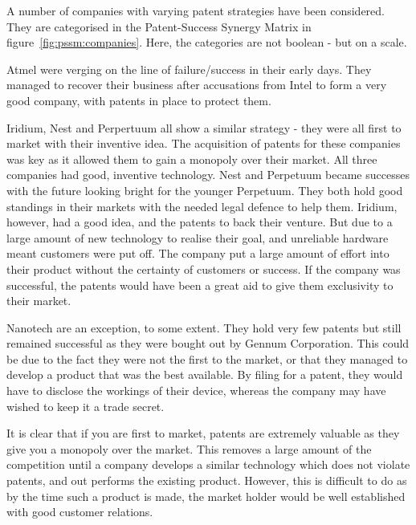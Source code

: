 {}

A number of companies with varying patent strategies have been considered.
They are categorised in the Patent-Success Synergy Matrix in figure~\ref{fig:pssm:companies}.
Here, the categories are not boolean - but on a scale. 

Atmel were verging on the line of failure/success in their early days. 
They managed to recover their business after accusations from Intel to form a very good company, with patents in place to protect them.

Iridium, Nest and Perpertuum all show a similar strategy - they were all first to market with their inventive idea.
The acquisition of patents for these companies was key as it allowed them to gain a monopoly over their market. 
All three companies had good, inventive technology.
Nest and Perpetuum became successes with the future looking bright for the younger Perpetuum. 
They both hold good standings in their markets with the needed legal defence to help them.
Iridium, however, had a good idea, and the patents to back their venture. 
But due to a large amount of new technology to realise their goal, and unreliable hardware meant customers were put off.
The company put a large amount of effort into their product without the certainty of customers or success. 
If the company was successful, the patents would have been a great aid to give them exclusivity to their market.

Nanotech are an exception, to some extent.
They hold very few patents \cite{nanotechpatent} but still remained successful as they were bought out by Gennum Corporation. 
This could be due to the fact they were not the first to the market, or that they managed to develop a product that was the best available. 
By filing for a patent, they would have to disclose the workings of their device, whereas the company may have wished to keep it a trade secret.

It is clear that if you are first to market, patents are extremely valuable as they give you a monopoly over the market. 
This removes a large amount of the competition until a company develops a similar technology which does not violate patents, and out performs the existing product. 
However, this is difficult to do as by the time such a product is made, the market holder would be well established with good customer relations.

